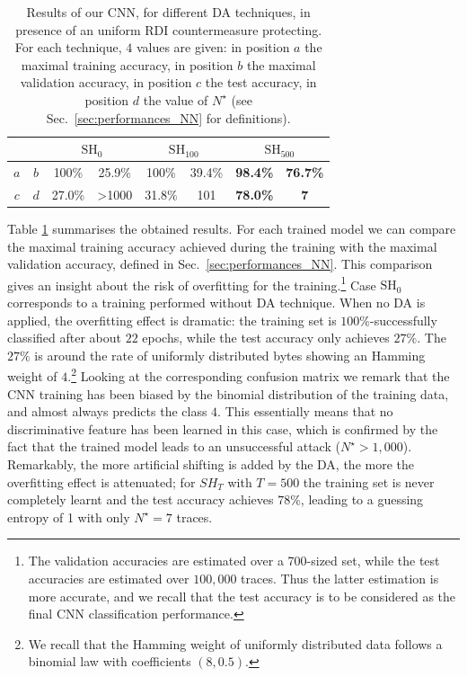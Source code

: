 \begin{table}[t]
\centering
\caption[Results of our CNN, for different DA techniques, in presence of an uniform RDI countermeasure protecting.]{Results of our CNN, for different DA techniques, in presence of an uniform RDI countermeasure protecting. For each technique, $4$ values are given: in position $a$ the maximal training accuracy, in position $b$ the maximal validation accuracy, in position $c$ the test accuracy, in position $d$ the value of $N^\star$ (see Sec.~\ref{sec:performances_NN} for definitions).}
\label{tab:res_CW_shift}
\begin{tabular}{|c|c|c|c|c|c|c|c|}
\hline
\multicolumn{2}{|c|}{} & \multicolumn{2}{c|}{$\mathrm{SH}_{0}$}                                    & \multicolumn{2}{c|}{$\mathrm{SH}_{100}$} & \multicolumn{2}{c|}{$\mathrm{SH}_{500}$} \\ \hline
$a$        & $b$       & \cellcolor[HTML]{EFEFEF}100\%  & \cellcolor[HTML]{EFEFEF}25.9\%           & 100\%               & 39.4\%             & \textbf{98.4\%}     & \textbf{76.7\%}    \\ \hline
$c$        & $d$       & \cellcolor[HTML]{EFEFEF}27.0\% & \cellcolor[HTML]{EFEFEF}\textgreater1000 & 31.8\%              & 101                & \textbf{78.0\%}     & \textbf{7}         \\ \hline
\end{tabular}
\end{table}

Table \ref{tab:res_CW_shift} summarises the obtained results.  For each trained model we can compare the maximal training accuracy achieved during the training with the maximal validation accuracy, defined in Sec.~\ref{sec:performances_NN}.  This comparison gives an insight about the risk of overfitting for the training.\footnote{The validation accuracies are estimated over a 700-sized set, while the test accuracies are estimated over $100,000$ traces. Thus the latter estimation is more accurate, and we recall that the test accuracy is to be considered as the final CNN classification performance.} Case $\mathrm{SH}_0$ corresponds to a training performed without DA technique. When no DA is applied, the overfitting effect is dramatic: the training set is $100\%$-successfully classified after about $22$ epochs, while the test accuracy only achieves $27\%$. The $27\%$ is around the rate of uniformly distributed bytes showing an Hamming weight of $4$.\footnote{We recall that the Hamming weight of uniformly distributed data follows a binomial law with coefficients $(8,0.5)$.} Looking at the corresponding confusion matrix we remark that the CNN training has been biased by the binomial distribution of the training data, and almost always predicts the class $4$. This essentially means that no discriminative feature has been learned in this case, which is confirmed by the fact that the trained model leads to an unsuccessful attack ($N^\star>1,000$). Remarkably, the more artificial shifting is added by the DA, the more the overfitting effect is attenuated; for $SH_T$ with \eg $T=500$ the training set is never completely learnt and the test accuracy achieves $78\%$, leading to a guessing entropy of 1 with only $N^{\star}=7$ traces. \\


